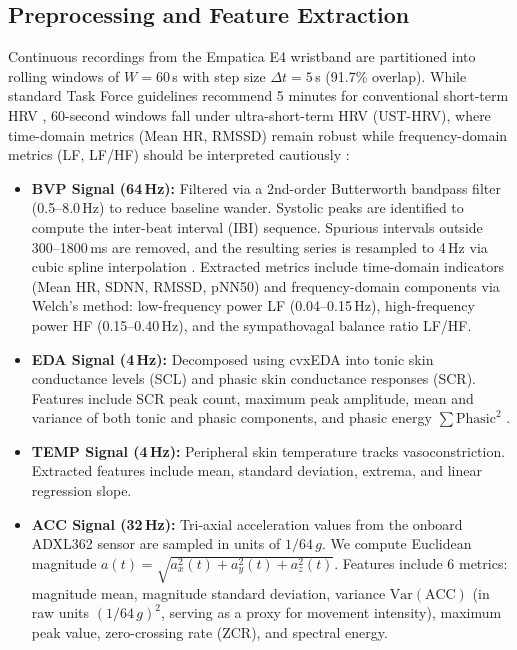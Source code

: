 \documentclass[conference]{IEEEtran}
\begin{document}
\subsection{Preprocessing and Feature Extraction}
Continuous recordings from the Empatica E4 wristband are partitioned into rolling windows of $W = 60$\,s with step size $\Delta t = 5$\,s (91.7\% overlap). While standard Task Force guidelines recommend 5 minutes for conventional short-term HRV \cite{taskforce1996heart}, 60-second windows fall under ultra-short-term HRV (UST-HRV), where time-domain metrics (Mean HR, RMSSD) remain robust while frequency-domain metrics (LF, LF/HF) should be interpreted cautiously \cite{castaldo2015acute}:
\begin{itemize}
    \item \textbf{BVP Signal (64\,Hz):} Filtered via a 2nd-order Butterworth bandpass filter (0.5--8.0\,Hz) to reduce baseline wander. Systolic peaks are identified to compute the inter-beat interval (IBI) sequence. Spurious intervals outside 300--1800\,ms are removed, and the resulting series is resampled to 4\,Hz via cubic spline interpolation \cite{tarvainen2014kubios}. Extracted metrics include time-domain indicators (Mean HR, SDNN, RMSSD, pNN50) and frequency-domain components via Welch's method: low-frequency power LF (0.04--0.15\,Hz), high-frequency power HF (0.15--0.40\,Hz), and the sympathovagal balance ratio LF/HF.
    \item \textbf{EDA Signal (4\,Hz):} Decomposed using cvxEDA \cite{greco2016cvxeda} into tonic skin conductance levels (SCL) and phasic skin conductance responses (SCR). Features include SCR peak count, maximum peak amplitude, mean and variance of both tonic and phasic components, and phasic energy $\sum \text{Phasic}^2$ \cite{boucsein2012electrodermal}.
    \item \textbf{TEMP Signal (4\,Hz):} Peripheral skin temperature tracks vasoconstriction. Extracted features include mean, standard deviation, extrema, and linear regression slope.
    \item \textbf{ACC Signal (32\,Hz):} Tri-axial acceleration values from the onboard ADXL362 sensor are sampled in units of $1/64\,g$. We compute Euclidean magnitude $a(t) = \sqrt{a_x^2(t) + a_y^2(t) + a_z^2(t)}$. Features include 6 metrics: magnitude mean, magnitude standard deviation, variance $\text{Var}(\text{ACC})$ (in raw units $(1/64\,g)^2$, serving as a proxy for movement intensity), maximum peak value, zero-crossing rate (ZCR), and spectral energy.
\end{itemize}
\end{document}
